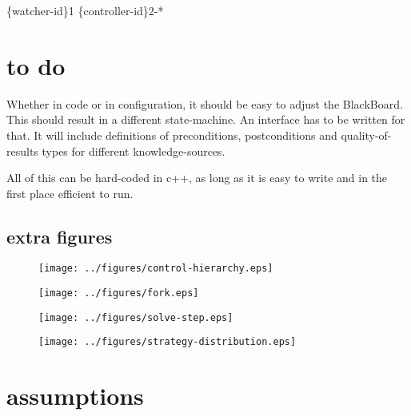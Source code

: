 \documentclass[]{lofar}
\begin{document}
        \{watcher-id\}1 \{controller-id\}2-*

  \section{to do}
  \label{sec:todo}\hypertarget{sec:todo}{}

    Whether in code or in configuration, it should be easy to adjust
    the BlackBoard. This should result in a different
    state-machine. An interface has to be written for that. It will
    include definitions of preconditions, postconditions and
    quality-of-results types for different knowledge-sources.

    All of this can be hard-coded in c++, as long as it is easy to
    write and in the first place efficient to run.

    \subsection{extra figures}
    \begin{figure}
      \texttt{[image: ../figures/control-hierarchy.eps]}
    \end{figure}

    \begin{figure}
      \texttt{[image: ../figures/fork.eps]}
    \end{figure}

    \begin{figure}
      \texttt{[image: ../figures/solve-step.eps]}
    \end{figure}

    \begin{figure}
      \texttt{[image: ../figures/strategy-distribution.eps]}
    \end{figure}

\newcommand{\dbappendix}[1]{\section{#1}}%

\appendix

  \dbappendix{assumptions}
  \label{app:assumptions}\hypertarget{app:assumptions}{}

\end{document}
